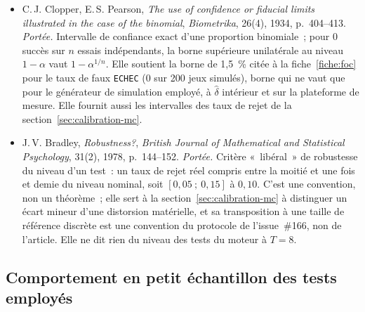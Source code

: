 \documentclass[a4paper,11pt]{article}
\newcommand{\code}[1]{\texttt{\small #1}}
\begin{document}
\begin{itemize}[itemsep=4pt]
  \item C.\,J. Clopper, E.\,S. Pearson, \emph{The use of confidence or fiducial
  limits illustrated in the case of the binomial}, \emph{Biometrika}, 26(4),
  1934, p.~404--413.
  \emph{Portée.} Intervalle de confiance exact d'une proportion binomiale~;
  pour 0 succès sur $n$ essais indépendants, la borne supérieure unilatérale
  au niveau $1-\alpha$ vaut $1 - \alpha^{1/n}$. Elle soutient la borne de
  1,5~\% citée à la fiche~\ref{fiche:foc} pour le taux de faux \code{ECHEC}
  (0 sur 200 jeux simulés), borne qui ne vaut que pour le générateur de
  simulation employé, à $\hat\delta$ intérieur et sur la plateforme de mesure.
  Elle fournit aussi les intervalles des taux de rejet de la
  section~\ref{sec:calibration-mc}.

  \item J.\,V. Bradley, \emph{Robustness?}, \emph{British Journal of
  Mathematical and Statistical Psychology}, 31(2), 1978, p.~144--152.
  \emph{Portée.} Critère «~libéral~» de robustesse du niveau d'un test~: un
  taux de rejet réel compris entre la moitié et une fois et demie du niveau
  nominal, soit $[0{,}05~;~0{,}15]$ à $0{,}10$. C'est une convention, non un
  théorème~; elle sert à la section~\ref{sec:calibration-mc} à distinguer un
  écart mineur d'une distorsion matérielle, et sa transposition à une taille de
  référence discrète est une convention du protocole de l'issue~\#166, non de
  l'article. Elle ne dit rien du niveau des tests du moteur à $T = 8$.
\end{itemize}

\subsection*{Comportement en petit échantillon des tests employés}
\end{document}
